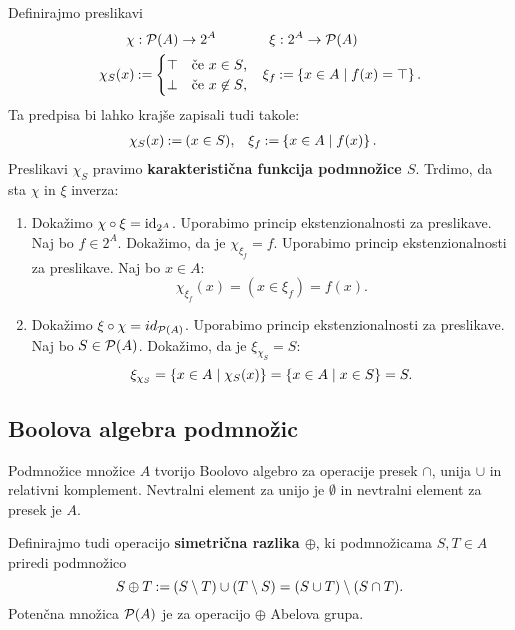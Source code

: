 \begin{dokaz}
  Definirajmo preslikavi
  \begin{align*}
    \chi &: \pow{A} \to 2^A &
    \xi &: 2^A \to \pow{A} \\
    \chi_S(x) &\defeq
      \begin{cases}
        \top & \text{če $x \in S$,} \\
        \bot & \text{če $x \not\in S$,}
      \end{cases}
    &
    \xi_f &\defeq \set{x \in A \such f(x) = \top}.
  \end{align*}
  Ta predpisa bi lahko krajše zapisali tudi takole:
  \begin{align*}
  \chi_S(x) &\defeq (x \in S), &
  \xi_f &\defeq \set{x \in A \such f(x) }.
  \end{align*}
  Preslikavi $\chi_S$ pravimo \textbf{karakteristična funkcija podmnožice $S$}.
  Trdimo, da sta $\chi$ in $\xi$ inverza:
  \begin{enumerate}
  \item 
    Dokažimo $\chi \circ \xi = \id[2^A]$. Uporabimo princip ekstenzionalnosti za preslikave.
    Naj bo $f \in 2^A$. Dokažimo, da je $\chi_{\xi_f} = f$.
    Uporabimo princip ekstenzionalnosti za preslikave. Naj bo $x \in A$:
    \begin{equation*}
      \chi_{\xi_f}(x) = (x \in \xi_f) = f(x).
    \end{equation*}

  \item
    Dokažimo $\xi \circ \chi = id_{\pow{A}}$. Uporabimo princip ekstenzionalnosti za preslikave. Naj bo $S \in \pow{A}$. Dokažimo, da je $\xi_{\chi_S} = S$:
    \begin{equation*}
      \xi_{\chi_S} = \set{x \in A \such \chi_S(x)} = \set{x \in A \such x \in S} = S.
    \end{equation*}
  \end{enumerate}
\end{dokaz}

\subsection{Boolova algebra podmnožic}

Podmnožice množice $A$ tvorijo Boolovo algebro za operacije presek $\cap$, unija $\cup$ in relativni komplement. Nevtralni element za unijo je $\emptyset$ in nevtralni element za presek je $A$.

Definirajmo tudi operacijo \textbf{simetrična razlika $\oplus$}, ki podmnožicama $S, T \in A$ priredi podmnožico
%
\begin{equation*}
  S \oplus T \defeq (S \setminus T) \cup (T \setminus S) = (S \cup T) \setminus (S \cap T).
\end{equation*}
%
Potenčna množica $\pow{A}$ je za operacijo $\oplus$ Abelova grupa.
